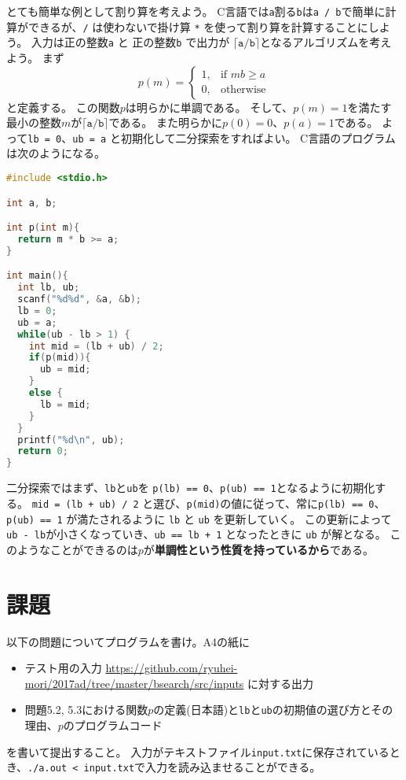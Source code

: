 \documentclass[a4paper,twoside,onecolumn,openany,article,10pt]{memoir}
\theoremstyle{remark}
\begin{document}
とても簡単な例として割り算を考えよう。
C言語では\texttt{a}割る\texttt{b}は\texttt{a / b}で簡単に計算ができるが、\texttt{/} は使わないで掛け算 \texttt{*} を使って割り算を計算することにしよう。
入力は正の整数\texttt{a} と 正の整数\texttt{b} で出力が $\mathtt{\lceil a / b \rceil}$となるアルゴリズムを考えよう。
まず
\begin{equation*}
p(m)=
\begin{cases}
1, & \text{if } mb \ge a\\
0, & \text{otherwise}
\end{cases}
\end{equation*}
と定義する。
この関数$p$は明らかに単調である。
そして、$p(m)=1$を満たす最小の整数$m$が$\mathtt{\lceil  a / b \rceil}$である。
また明らかに$p(0)=0$、$p(a)=1$である。
よって\texttt{lb = 0}、\texttt{ub = a} と初期化して二分探索をすればよい。
C言語のプログラムは次のようになる。

\begin{lstlisting}[basicstyle=\ttfamily\small,showstringspaces=false,language=C,frame=single]
#include <stdio.h>

int a, b;

int p(int m){
  return m * b >= a;
}

int main(){
  int lb, ub;
  scanf("%d%d", &a, &b);
  lb = 0;
  ub = a;
  while(ub - lb > 1) {
    int mid = (lb + ub) / 2;
    if(p(mid)){
      ub = mid;
    }
    else {
      lb = mid;
    }
  }
  printf("%d\n", ub);
  return 0;
}
\end{lstlisting}

二分探索ではまず、\texttt{lb}と\texttt{ub}を \texttt{p(lb) == 0}、\texttt{p(ub) == 1}となるように初期化する。
\texttt{mid = (lb + ub) / 2} と選び、\texttt{p(mid)}の値に従って、常に\texttt{p(lb) == 0}、\texttt{p(ub) == 1} が満たされるように \texttt{lb} と \texttt{ub} を更新していく。
この更新によって\texttt{ub - lb}が小さくなっていき、\texttt{ub == lb + 1} となったときに \texttt{ub} が解となる。
このようなことができるのは$p$が\textbf{単調性という性質を持っているから}である。

\clearpage
\section{課題}\label{sec:assign}
以下の問題についてプログラムを書け。A4の紙に
\begin{itemize}
\item テスト用の入力 \url{https://github.com/ryuhei-mori/2017ad/tree/master/bsearch/src/inputs} に対する出力
\item 問題5.2, 5.3における関数$p$の定義(日本語)と\texttt{lb}と\texttt{ub}の初期値の選び方とその理由、$p$のプログラムコード
\end{itemize}
を書いて提出すること。
入力がテキストファイル\texttt{input.txt}に保存されているとき、\texttt{./a.out < input.txt}で入力を読み込ませることができる。
\end{document}
